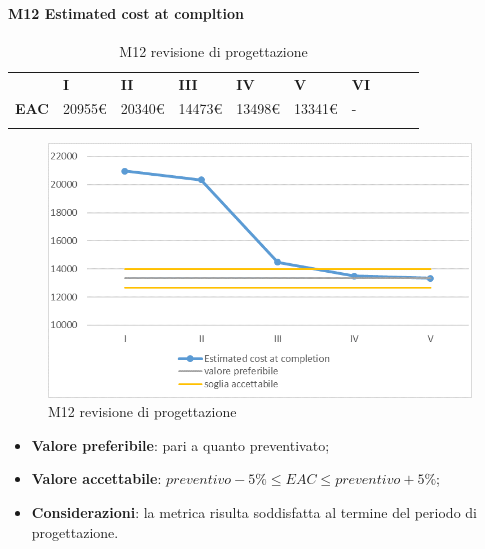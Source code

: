 \paragraph{M12 Estimated cost at compltion} \mbox{}
\begin{longtable}[H!] {						
		>{}p{38mm}  		
		>{}p{12mm}
		>{}p{12mm}		
		>{}p{12mm}		
		>{}p{12mm}		
		>{}p{12mm}		
		>{}p{12mm}
		>{}p{12mm}
		>{}p{12mm}
		>{}p{12mm}
	}
	\rowcolor{gray!50}
	\textbf{} & \textbf{I} & \textbf{II} & \textbf{III} & \textbf{IV} & \textbf{V} & \textbf{VI} \TBstrut \\ [2mm]
	\textbf{EAC} & 20955\euro & 20340\euro & 14473\euro & 13498\euro & 13341\euro & - \TBstrut \\ [2mm]
	\rowcolor{white}
	\caption{M12 revisione di progettazione}
\end{longtable}
\begin{figure}[H] 	
\includegraphics[width=\linewidth]{./img/grafici/RP9.png}	
\caption{M12 revisione di progettazione}	
\end{figure}
\begin{itemize}
	\item \textbf{Valore preferibile}: pari a quanto preventivato;
	\item \textbf{Valore accettabile}: $preventivo-5\% \le EAC \le preventivo+5\%$;
	\item \textbf{Considerazioni}: la metrica risulta soddisfatta al termine del periodo di progettazione.
\end{itemize}
